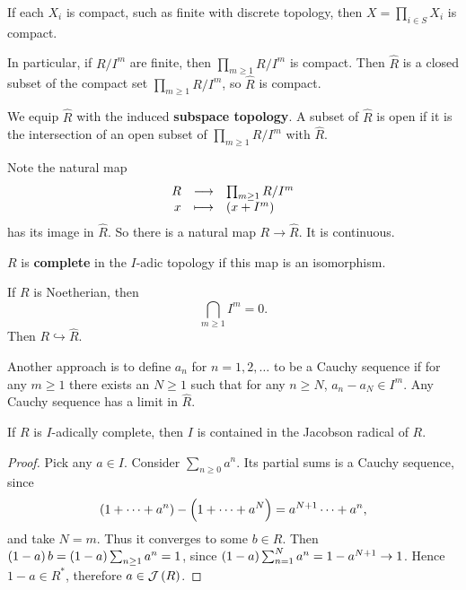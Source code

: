 \begin{theorem}
If each $ X_i $ is compact, such as finite with discrete topology, then $ X = \prod_{i \in S} X_i $ is compact.
\end{theorem}

\begin{example}
In particular, if $ R / I^m $ are finite, then $ \prod_{m \ge 1} R / I^m $ is compact. Then $ \widehat{R} $ is a closed subset of the compact set $ \prod_{m \ge 1} R / I^m $, so $ \widehat{R} $ is compact.
\end{example}

\begin{definition}
We equip $ \widehat{R} $ with the induced \textbf{subspace topology}. A subset of $ \widehat{R} $ is open if it is the intersection of an open subset of $ \prod_{m \ge 1} R / I^m $ with $ \widehat{R} $.
\end{definition}

Note the natural map
$$ \function{R}{\prod_{m \ge 1} R / I^m}{x}{\br{x + I^m}} $$
has its image in $ \widehat{R} $. So there is a natural map $ R \to \widehat{R} $. It is continuous.

\begin{definition}
$ R $ is \textbf{complete} in the $ I $-adic topology if this map is an isomorphism.
\end{definition}

\pagebreak

\begin{theorem}
If $ R $ is Noetherian, then
$$ \bigcap_{m \ge 1} I^m = 0. $$
Then $ R \hookrightarrow \widehat{R} $.
\end{theorem}

Another approach is to define $ a_n $ for $ n = 1, 2, \dots $ to be a Cauchy sequence if for any $ m \ge 1 $ there exists an $ N \ge 1 $ such that for any $ n \ge N $, $ a_n - a_N \in I^m $. Any Cauchy sequence has a limit in $ \widehat{R} $.

\begin{lemma}
If $ R $ is $ I $-adically complete, then $ I $ is contained in the Jacobson radical of $ R $.
\end{lemma}

\begin{proof}
Pick any $ a \in I $. Consider $ \sum_{n \ge 0} a^n $. Its partial sums is a Cauchy sequence, since
$$ \br{1 + \dots + a^n} - \br{1 + \dots + a^N} = a^{N + 1} \dots + a^n, $$
and take $ N = m $. Thus it converges to some $ b \in R $. Then $ \br{1 - a}b = \br{1 - a}\sum_{n \ge 1} a^n = 1 $, since $ \br{1 - a}\sum_{n = 1}^N a^n = 1 - a^{N + 1} \to 1 $. Hence $ 1 - a \in R^* $, therefore $ a \in \JJJ\br{R} $.
\end{proof}

